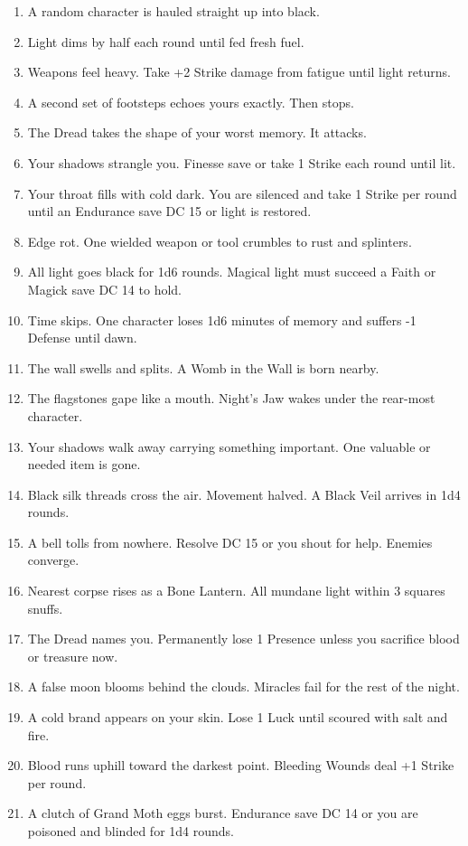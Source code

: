 \documentclass[10pt,twoside]{article}
\begin{document}
\begin{multicols}{2}
{\begin{enumerate}
\item A random character is hauled straight up into black.
\item Light dims by half each round until fed fresh fuel.
\item Weapons feel heavy. Take +2 Strike damage from fatigue until light returns.
\item A second set of footsteps echoes yours exactly. Then stops.
\item The Dread takes the shape of your worst memory. It attacks.
\item Your shadows strangle you. Finesse save or take 1 Strike each round until lit.
\item Your throat fills with cold dark. You are silenced and take 1 Strike per round until an Endurance save DC 15 or light is restored.
\item Edge rot. One wielded weapon or tool crumbles to rust and splinters.
\item All light goes black for 1d6 rounds. Magical light must succeed a Faith or Magick save DC 14 to hold.
\item Time skips. One character loses 1d6 minutes of memory and suffers -1 Defense until dawn.
\item The wall swells and splits. A Womb in the Wall is born nearby.
\item The flagstones gape like a mouth. Night's Jaw wakes under the rear-most character.
\item Your shadows walk away carrying something important. One valuable or needed item is gone.
\item Black silk threads cross the air. Movement halved. A Black Veil arrives in 1d4 rounds.
\item A bell tolls from nowhere. Resolve DC 15 or you shout for help. Enemies converge.
\item Nearest corpse rises as a Bone Lantern. All mundane light within 3 squares snuffs.
\item The Dread names you. Permanently lose 1 Presence unless you sacrifice blood or treasure now.
\item A false moon blooms behind the clouds. Miracles fail for the rest of the night.
\item A cold brand appears on your skin. Lose 1 Luck until scoured with salt and fire.
\item Blood runs uphill toward the darkest point. Bleeding Wounds deal +1 Strike per round.
\item A clutch of Grand Moth eggs burst. Endurance save DC 14 or you are poisoned and blinded for 1d4 rounds.

\end{enumerate}}
\end{multicols}
\end{document}
